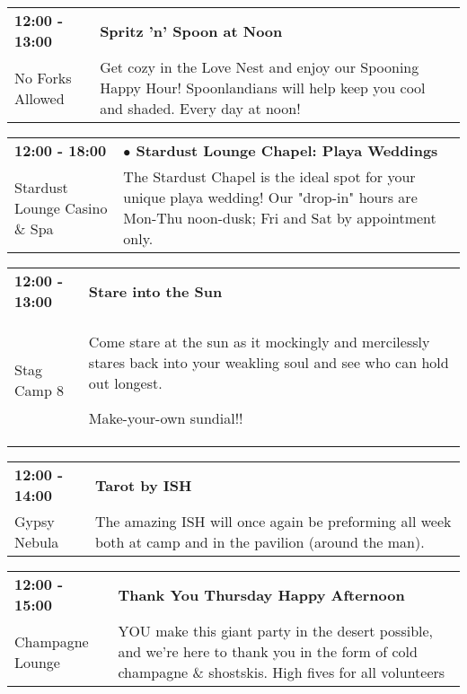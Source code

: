 \begin{tabular}{ p{1in} p{2.2in} }
    \textbf{12:00 - 13:00} & \textbf{Spritz 'n' Spoon at Noon} \\
    No Forks Allowed \newline  & Get cozy in the Love Nest and enjoy our Spooning Happy Hour! Spoonlandians will help keep you cool and shaded. Every day at noon! \\
    \hline 
\end{tabular}
    
\begin{tabular}{ p{1in} p{2.2in} }
    \textbf{12:00 - 18:00} & \textbf{$\bullet$	Stardust Lounge Chapel: Playa Weddings} \\
    Stardust Lounge Casino \& Spa \newline  & The Stardust Chapel is the ideal spot for your unique playa wedding! Our "drop-in" hours are Mon-Thu noon-dusk; Fri and Sat by appointment only. \\
    \hline 
\end{tabular}
    
\begin{tabular}{ p{1in} p{2.2in} }
    \textbf{12:00 - 13:00} & \textbf{Stare into the Sun} \\
    Stag Camp 8 \newline  & Come stare at the sun as it mockingly and mercilessly stares back into your weakling soul and see who can hold out longest.

Make-your-own sundial!! \\
    \hline 
\end{tabular}
    
\begin{tabular}{ p{1in} p{2.2in} }
    \textbf{12:00 - 14:00} & \textbf{Tarot by ISH} \\
    Gypsy Nebula \newline  & The amazing ISH will once again be preforming all week both at camp and in the pavilion (around the man). \\
    \hline 
\end{tabular}
    
\begin{tabular}{ p{1in} p{2.2in} }
    \textbf{12:00 - 15:00} & \textbf{Thank You Thursday Happy Afternoon} \\
    Champagne Lounge \newline  & YOU make this giant party in the desert possible, and we're here to thank you in the form of cold champagne \& shostskis. High fives for all volunteers \\
    \hline 
\end{tabular}
    
